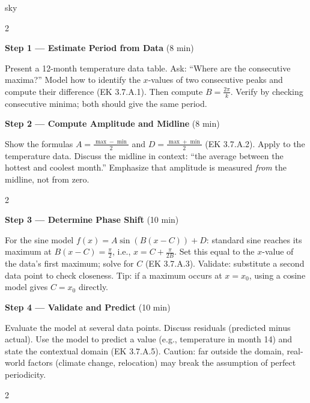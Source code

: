 \documentclass[10pt]{article}
\begin{document}
\begin{skillbox}{sky}
\begin{multicols}{2}

\textbf{Step 1 --- Estimate Period from Data} (8 min)

Present a 12-month temperature data table. Ask: ``Where are the consecutive
maxima?'' Model how to identify the $x$-values of two consecutive peaks and
compute their difference (EK 3.7.A.1). Then compute $B = \tfrac{2\pi}{k}$.
Verify by checking consecutive minima; both should give the same period.

\columnbreak

\textbf{Step 2 --- Compute Amplitude and Midline} (8 min)

Show the formulas $A = \tfrac{\max - \min}{2}$ and $D = \tfrac{\max + \min}{2}$
(EK 3.7.A.2). Apply to the temperature data. Discuss the midline in context:
``the average between the hottest and coolest month.'' Emphasize that amplitude
is measured \emph{from} the midline, not from zero.

\end{multicols}

\begin{multicols}{2}

\textbf{Step 3 --- Determine Phase Shift} (10 min)

For the sine model $f(x) = A\sin(B(x - C)) + D$: standard sine reaches its
maximum at $B(x - C) = \tfrac{\pi}{2}$, i.e., $x = C + \tfrac{\pi}{2B}$.
Set this equal to the $x$-value of the data's first maximum; solve for $C$
(EK 3.7.A.3). Validate: substitute a second data point to check closeness.
Tip: if a maximum occurs at $x = x_0$, using a cosine model gives $C = x_0$
directly.

\columnbreak

\textbf{Step 4 --- Validate and Predict} (10 min)

Evaluate the model at several data points. Discuss residuals (predicted minus
actual). Use the model to predict a value (e.g., temperature in month 14)
and state the contextual domain (EK 3.7.A.5). Caution: far outside the domain,
real-world factors (climate change, relocation) may break the assumption of
perfect periodicity.

\end{multicols}

\begin{multicols}{2}


\end{multicols}
\end{skillbox}
\end{document}
